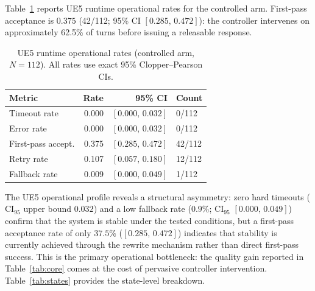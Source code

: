 \documentclass[conference]{IEEEtran}
\begin{document}
Table~\ref{tab:ops} reports UE5 runtime operational rates for
the controlled arm. First-pass acceptance is $0.375$ (42/112;
95\% CI $[0.285,\,0.472]$): the controller intervenes on
approximately 62.5\% of turns before issuing a releasable
response.

\begin{table}[!t]
\renewcommand{\arraystretch}{1.2}
\caption{UE5 runtime operational rates (controlled arm,
$N=112$). All rates use exact 95\% Clopper--Pearson CIs.}
\label{tab:ops}
\centering
\setlength{\tabcolsep}{5pt}
\begin{tabular}{lrrl}
\toprule
Metric & Rate & 95\% CI & Count \\
\midrule
Timeout rate       & 0.000 & $[0.000,\,0.032]$ & 0/112 \\
Error rate         & 0.000 & $[0.000,\,0.032]$ & 0/112 \\
First-pass accept. & 0.375 & $[0.285,\,0.472]$ & 42/112 \\
Retry rate         & 0.107 & $[0.057,\,0.180]$ & 12/112 \\
Fallback rate      & 0.009 & $[0.000,\,0.049]$ & 1/112 \\
\bottomrule
\end{tabular}
\end{table}

The UE5 operational profile reveals a structural asymmetry:
zero hard timeouts ($\mathrm{CI}_{95}$ upper bound $0.032$)
and a low fallback rate ($0.9\%$; $\mathrm{CI}_{95}$ $[0.000,\,0.049]$)
confirm that the system is stable under the tested conditions,
but a first-pass acceptance rate of only $37.5\%$
($[0.285,\,0.472]$) indicates that stability is currently
achieved through the rewrite mechanism rather than direct
first-pass success. This is the primary operational
bottleneck: the quality gain reported in Table~\ref{tab:core}
comes at the cost of pervasive controller intervention.
Table~\ref{tab:states} provides the state-level breakdown.
\end{document}
